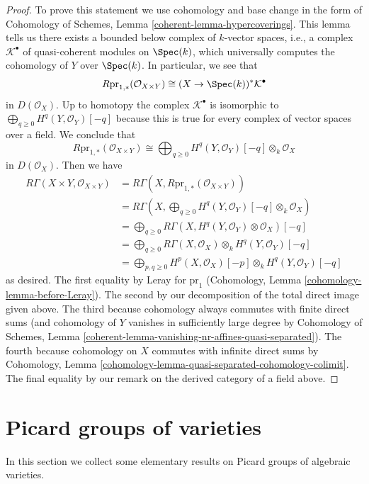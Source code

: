 \begin{proof}
\medskip\noindent
To prove this statement we use cohomology and base change in the form
of Cohomology of Schemes, Lemma \ref{coherent-lemma-hypercoverings}.
This lemma tells us there exists a bounded below complex of $k$-vector spaces,
i.e., a complex $\mathcal{K}^\bullet$ of quasi-coherent modules on $\Spec(k)$,
which universally computes the cohomology of $Y$ over $\Spec(k)$.
In particular, we see that
$$
R\text{pr}_{1, *}(\mathcal{O}_{X \times Y}) \cong
(X \to \Spec(k))^*\mathcal{K}^\bullet
$$
in $D(\mathcal{O}_X)$. Up to homotopy the complex $\mathcal{K}^\bullet$
is isomorphic to $\bigoplus_{q \geq 0} H^q(Y, \mathcal{O}_Y)[-q]$ because
this is true for every complex of vector spaces over a field.
We conclude that
$$
R\text{pr}_{1, *}(\mathcal{O}_{X \times Y}) \cong
\bigoplus\nolimits_{q \geq 0}
H^q(Y, \mathcal{O}_Y)[-q] \otimes_k \mathcal{O}_X
$$
in $D(\mathcal{O}_X)$. Then we have
\begin{align*}
R\Gamma(X \times Y, \mathcal{O}_{X \times Y})
& =
R\Gamma(X, R\text{pr}_{1, *}(\mathcal{O}_{X \times Y})) \\
& =
R\Gamma(X, \bigoplus\nolimits_{q \geq 0}
H^q(Y, \mathcal{O}_Y)[-q] \otimes_k \mathcal{O}_X) \\
& =
\bigoplus\nolimits_{q \geq 0}
R\Gamma(X,  H^q(Y, \mathcal{O}_Y) \otimes \mathcal{O}_X)[-q] \\
& =
\bigoplus\nolimits_{q \geq 0}
R\Gamma(X, \mathcal{O}_X) \otimes_k H^q(Y, \mathcal{O}_Y)[-q] \\
& =
\bigoplus\nolimits_{p, q \geq 0}
H^p(X, \mathcal{O}_X)[-p] \otimes_k H^q(Y, \mathcal{O}_Y)[-q]
\end{align*}
as desired. The first equality by Leray for $\text{pr}_1$
(Cohomology, Lemma \ref{cohomology-lemma-before-Leray}).
The second by our decomposition of the total direct image given above.
The third because cohomology always commutes with finite direct sums
(and cohomology of $Y$ vanishes in sufficiently large degree by
Cohomology of Schemes, Lemma
\ref{coherent-lemma-vanishing-nr-affines-quasi-separated}).
The fourth because cohomology on $X$ commutes with infinite
direct sums by Cohomology, Lemma
\ref{cohomology-lemma-quasi-separated-cohomology-colimit}.
The final equality by our remark on the derived category
of a field above.
\end{proof}

\section{Picard groups of varieties}
\label{varieties-section-picard-groups}
In this section we collect some elementary results on Picard groups
of algebraic varieties.

